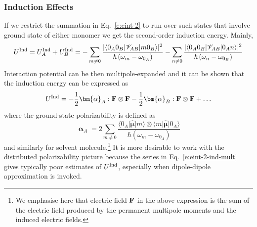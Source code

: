 \documentclass[a4paper,titlepage,twoside,fleqn,12pt]{book}
\newcommand{\BM}[1]{\bm{#1}}
\begin{document}
\begin{refsection}
\subsubsection{Induction Effects\label{s:dw-poldisp-pol}}

If we restrict the summation in Eq.~\eqref{e:eint-2} to run over such states
that involve ground state of either monomer
we get the second\hyp{}order induction energy. Mainly,
%
\begin{equation} \label{e:eint-2-ind}
U^{\rm Ind} = U^{\rm Ind}_A + U^{\rm Ind}_B =
- \sum_{m\ne 0} \frac{
\lvert \langle 0_A0_B \lvert \mathscr{V}_{AB} \rvert m0_B \rangle \rvert^2
}{\hbar \left( \omega_{m} - \omega_{0_A}\right)}
%
- \sum_{n\ne 0} \frac{
\lvert \langle 0_A0_B \lvert \mathscr{V}_{AB} \rvert 0_An \rangle \rvert^2
}{\hbar \left( \omega_{n} - \omega_{0_B}\right)}
\end{equation}
%
Interaction potential can be then multipole\hyp{}expanded and
it can be shown that the induction energy
can be expressed as
%
\begin{equation} \label{e:eint-2-ind-mult}
U^{\rm Ind} = - \frac{1}{2} {\BM \alpha}_A : {\bf F} \otimes {\bf F} 
              - \frac{1}{2} {\BM \alpha}_B : {\bf F} \otimes {\bf F} + \ldots
\end{equation}
% 
where the ground\hyp{}state polarizability is defined as
%
\begin{equation} \label{e:polarizability}
{\BM \upalpha}_A = 2\sum_{m\neq 0} \frac{
\langle 0_A \lvert \hat{\BM \mu} \rvert m \rangle \otimes \langle m \lvert \hat{\BM \mu} \rvert 0_A \rangle 
}{\hbar \left( \omega_{m} - \omega_{0_A}\right)}
\end{equation}
%
and similarly for solvent molecule.\footnote{We emphasise here
that electric field $\bf F$ in the above expression
is the sum of the electric field produced by the permanent
multipole moments and the induced electric fields.}
It is more desirable to work with
the distributed polarizability picture because the series in 
Eq.~\eqref{e:eint-2-ind-mult} gives typically poor estimates of $U^{\rm Ind}$,
especially when dipole\hyp{}dipole approximation is invoked. 


\end{refsection}
\end{document}
